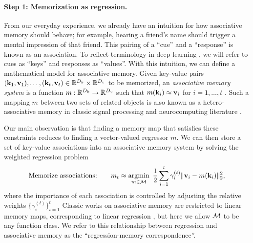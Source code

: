 \documentclass[notitlepage, 11pt]{article}
\newcommand*{\memory}{{m}}
\newcommand*{\dkey}{{D_k}}
\newcommand*{\dval}{{D_v}}
\begin{document}
\paragraph{Step 1: Memorization as regression.}
From our everyday experience, we already have an intuition for how associative memory should behave; for example, hearing a friend's name should trigger a mental impression of that friend.
This pairing of a ``cue'' and a ``response'' is known as an association.
To reflect terminology in deep learning \citep{Vaswani2017AttentionAllYou}, we will refer to cues as ``keys'' and responses as ``values''.
With this intuition, we can define a mathematical model for associative memory.
Given key-value pairs $(\kbf_1, \vbf_1), \ldots, (\kbf_t, \vbf_t) \in \reals^\dkey \times \reals^\dval$ to be memorized, an \emph{associative memory system} is a function $\memory: \reals^\dkey \to \reals^\dval$ such that $\memory(\kbf_i)\approx\vbf_i$ for $i=1, \ldots, t$ \citep{Kohonen1972CorrelationMatrixMemories,Kohonen1989SelfOrganizationAssociativeMemory}.
Such a mapping $\memory$ between two sets of related objects is also known as a hetero-associative memory in classic signal processing and neurocomputing literature \citep{Hinton1989ParallelModelsAssociative}.

Our main observation is that finding a memory map that satisfies these constraints reduces to finding a vector-valued regressor $\memory$.
We can then store a set of key-value associations into an associative memory system by solving the weighted regression problem
\begin{align}\label{eqn:general-least-squares}
    \text{Memorize associations:}\quad \quad \memory_t \approx \argmin_{\memory\in \Mcal}\ \frac{1}{2}\sum_{i=1}^t\gamma_i^{(t)}\norm{\vbf_i - \memory(\kbf_i)}_2^2,
\end{align}
where the importance of each association is controlled by adjusting the relative weights $\{\gamma_i^{(t)}\}_{i=1}^t$
Classic works on associative memory are restricted to linear memory maps, corresponding to linear regression  \citep[Chapter 6.6]{Kohonen1989SelfOrganizationAssociativeMemory}, but here we allow $\mathcal{M}$ to be any function class.
We refer to this relationship between regression and associative memory as the ``regression-memory correspondence''.
\end{document}
